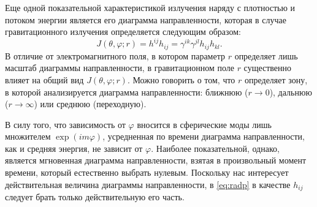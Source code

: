 \documentclass[\docroot/reports/draft/report.tex]{subfiles}
\begin{document}
    Еще одной показательной характеристикой излучения наряду с плотностью и потоком энергии является его диаграмма направленности, которая в случае гравитационного излучения определяется следующим образом:
    \begin{equation}\label{eq:radp}
        J(\theta,\varphi;r) = h^{ij}h_{ij} = \gamma^{ik}\gamma^{jl}h_{ij}h_{kl}.
    \end{equation}
    В отличие от электромагнитного поля, в котором параметр $r$ определяет лишь масштаб диаграммы направленности, в гравитационном поле $r$ существенно влияет на общий вид $J(\theta,\varphi;r)$. Можно говорить о том, что $r$ определяет зону, в которой анализируется диаграмма направленности: ближнюю ($r \to 0$), дальнюю ($r \to \infty$) или среднюю (переходную).

    В силу того, что зависимость от $\varphi$ вносится в сферические моды лишь множителем $\exp(im\varphi)$, усредненная по времени диаграмма направленности, как и средняя энергия, не зависит от $\varphi$. Наиболее показательной, однако, является мгновенная диаграмма направленности, взятая в произвольный момент времени, который естественно выбрать нулевым. Поскольку нас интересует действительная величина диаграммы направленности, в \autoref{eq:radp} в качестве $h_{ij}$ следует брать только действительную его часть.
\end{document}
